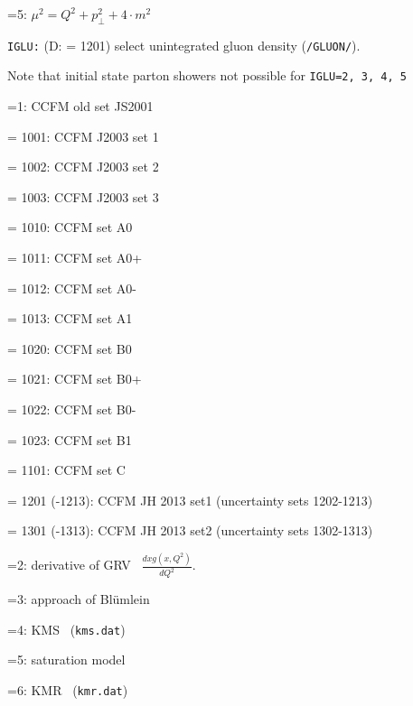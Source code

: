 \documentclass[11pt]{article} \usepackage{mystyle-new}
\newcommand{\deflab}[1]{#1\hfil}%
\newenvironment{defl}[1]%
  {\begin{list}{}{\settowidth{\labelwidth}{#1}%
  \setlength{\leftmargin}{\labelwidth}%
  \addtolength{\leftmargin}{\labelsep}%
  \setlength{\itemsep}{0pt plus 1pt}
  \setlength{\parsep}{0pt plus 1pt}
  \setlength{\topsep}{0pt plus 1pt}
  \setlength{\partopsep}{0pt plus 1pt}
  \setlength{\parskip}{2mm plus 1mm minus 1mm}
  \let\makelabel\deflab}}%
  {\end{list}}
\begin{document}
\begin{defl}{123456789012345}
\item[]
                        =5:  $\mu^2 = Q^2 + p_{\perp} ^2 + 4 \cdot m^2 $
\item[{\tt IGLU:}]  (D: = 1201)
			select unintegrated gluon density ({\tt /GLUON/}).
\item[]	Note that initial state parton showers not possible for 
\verb+IGLU=2, 3, 4, 5+
\item[]
                        =1:  CCFM old set JS2001 \cite{jung_salam_2000}	
\item[]                 =  1001: CCFM J2003 set 1 \cite{jung-dis03}
\item[]                 =  1002: CCFM J2003 set 2 \cite{jung-dis03}
\item[]                 =  1003: CCFM J2003 set 3 \cite{jung-dis03}
\item[]                 =  1010: CCFM set A0 \cite{jung-dis04}
\item[]                 =  1011: CCFM set A0+ \cite{jung-dis04}
\item[]                 =  1012: CCFM set A0- \cite{jung-dis04}
\item[]                 =  1013: CCFM set A1 \cite{jung-dis04}
\item[]                 =  1020: CCFM set B0 \cite{jung-dis04}
\item[]                 =  1021: CCFM set B0+ \cite{jung-dis04}
\item[]                 =  1022: CCFM set B0- \cite{jung-dis04}
\item[]                 =  1023: CCFM set B1 \cite{jung-dis04}
\item[]                 =  1101: CCFM set C \cite{jung-dis07}
\item[]                 =  1201 (-1213): CCFM  JH 2013 set1 \cite{Hautmann:2013tba} (uncertainty sets 1202-1213)
\item[]                 =  1301 (-1313): CCFM  JH 2013 set2 \cite{Hautmann:2013tba} (uncertainty sets 1302-1313)
\item[]
                        =2:  derivative of GRV~\cite{GRV95}
				$\frac{d xg(x,Q^2)}{dQ^2}$.
\item[]
                        =3:  approach of Bl\"umlein~\cite{Bluemlein}
\item[]
                        =4:  KMS~\cite{martin_stasto} (\verb+kms.dat+)
\item[]
                        =5:  saturation model~\cite{wuesthoff_golec-biernat}
\item[]
                        =6:  KMR~\cite{martin_kimber} (\verb+kmr.dat+)

\end{defl}
\end{document}
